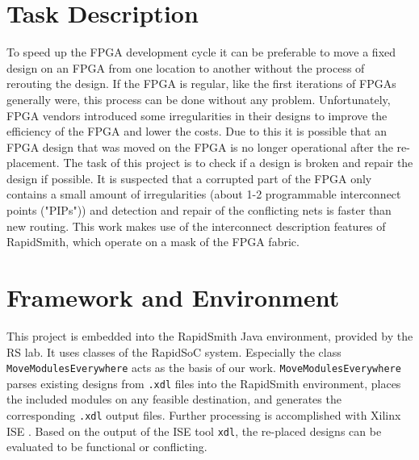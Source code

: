 \section{Task Description}
\label{sec:taskdescription}
To speed up the FPGA development cycle it can be preferable to move a fixed design on an FPGA from one location to another without the process of rerouting the design. If the FPGA is regular, like the first iterations of FPGAs generally were, this process can be done without any problem. Unfortunately, FPGA vendors introduced some irregularities in their designs to improve the efficiency of the FPGA and lower the costs. 
Due to this it is possible that an FPGA design that was moved on the FPGA is no longer operational after the re-placement.
The task of this project is to check if a design is broken and repair the design if possible.
It is suspected that a corrupted part of the FPGA only contains a small amount of irregularities (about 1-2 programmable interconnect points ("PIPs")) and detection and repair of the conflicting nets is faster than new routing. This work makes use of the interconnect description features of RapidSmith, which operate on a mask of the FPGA fabric.

\section{Framework and Environment}
\label{sec:frameworkandenvironment}

This project is embedded into the RapidSmith Java environment, provided by the RS lab. It uses classes of the RapidSoC system. Especially the class \texttt{MoveModulesEverywhere} acts as the basis of our work. \texttt{MoveModulesEverywhere} parses existing designs from \texttt{.xdl} files into the RapidSmith environment, places the included modules on any feasible destination, and generates the corresponding \texttt{.xdl} output files. Further processing is accomplished with Xilinx ISE \cite{ise}. Based on the output of the ISE tool \texttt{xdl}, the re-placed designs can be evaluated to be functional or conflicting.

